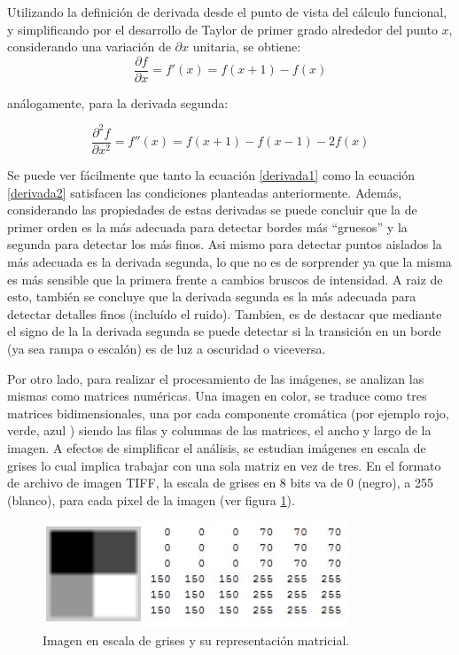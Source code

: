 Utilizando la definición de derivada desde el punto de vista del cálculo funcional, y simplificando por el desarrollo de Taylor de primer grado alrededor del punto $x$, considerando una variación de $\partial x$ unitaria, se obtiene:
\begin{equation}
\frac{\partial f}{\partial x} = f'(x) = f(x+1)-f(x)
\label{derivada1}
\end{equation}

análogamente, para la derivada segunda:

\begin{equation}
\frac{\partial^2 f}{\partial x^2} = f''(x) = f(x+1)-f(x-1)-2f(x)
\label{derivada2}
\end{equation}

Se puede ver fácilmente que tanto la ecuación \ref{derivada1} como la ecuación \ref{derivada2} satisfacen las condiciones planteadas anteriormente. Además, considerando las propiedades de estas derivadas se puede concluir que la de primer orden es la más adecuada para detectar bordes más ``gruesos'' y la segunda para detectar los más finos. Asi mismo para detectar puntos aislados la más adecuada es la derivada segunda, lo que no es de sorprender ya que la misma es más sensible que la primera frente a cambios bruscos de intensidad. A raiz de esto, también se concluye que la derivada segunda es la más adecuada para detectar detalles finos (incluído el ruido). Tambien, es de destacar que mediante el signo de la la derivada segunda se puede detectar si la transición en un borde (ya sea rampa o escalón) es de luz a oscuridad o viceversa.

Por otro lado, para realizar el procesamiento de las imágenes, se analizan las mismas como matrices numéricas. Una imagen en color, se traduce como tres matrices bidimensionales, una por cada componente cromática (por ejemplo rojo, verde, azul ) siendo las filas y columnas de las matrices, el ancho y largo de la imagen. 
A efectos de simplificar el análisis, se estudian imágenes en escala de grises lo cual implica trabajar con una sola matriz en vez de tres. En el formato de archivo de imagen TIFF, la escala de grises en 8 bits va de 0 (negro), a 255 (blanco), para cada pixel de la imagen (ver figura \ref{gonz2}).

\begin{figure}[hbt]
\begin{center}
\includegraphics[scale=0.8]{img/02_escala_grises.jpg}
\end{center}
\caption{Imagen en escala de grises y su representación matricial.}
\label{gonz2}
\end{figure}

